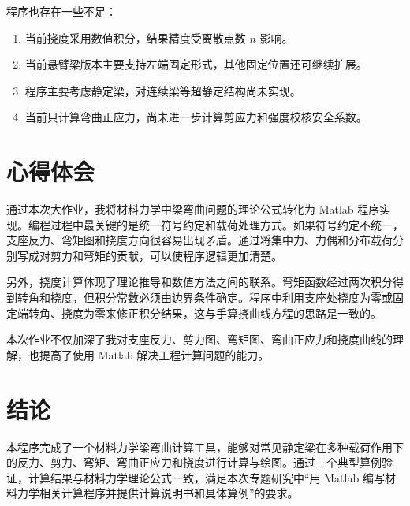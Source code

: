 \documentclass[UTF8,a4paper,12pt]{ctexart}
\numberwithin{equation}{section}
\begin{document}
程序也存在一些不足：

\begin{enumerate}
    \item 当前挠度采用数值积分，结果精度受离散点数 $n$ 影响。
    \item 当前悬臂梁版本主要支持左端固定形式，其他固定位置还可继续扩展。
    \item 程序主要考虑静定梁，对连续梁等超静定结构尚未实现。
    \item 当前只计算弯曲正应力，尚未进一步计算剪应力和强度校核安全系数。
\end{enumerate}

\section{心得体会}

通过本次大作业，我将材料力学中梁弯曲问题的理论公式转化为 Matlab 程序实现。编程过程中最关键的是统一符号约定和载荷处理方式。如果符号约定不统一，支座反力、弯矩图和挠度方向很容易出现矛盾。通过将集中力、力偶和分布载荷分别写成对剪力和弯矩的贡献，可以使程序逻辑更加清楚。

另外，挠度计算体现了理论推导和数值方法之间的联系。弯矩函数经过两次积分得到转角和挠度，但积分常数必须由边界条件确定。程序中利用支座处挠度为零或固定端转角、挠度为零来修正积分结果，这与手算挠曲线方程的思路是一致的。

本次作业不仅加深了我对支座反力、剪力图、弯矩图、弯曲正应力和挠度曲线的理解，也提高了使用 Matlab 解决工程计算问题的能力。

\section{结论}

本程序完成了一个材料力学梁弯曲计算工具，能够对常见静定梁在多种载荷作用下的反力、剪力、弯矩、弯曲正应力和挠度进行计算与绘图。通过三个典型算例验证，计算结果与材料力学理论公式一致，满足本次专题研究中“用 Matlab 编写材料力学相关计算程序并提供计算说明书和具体算例”的要求。
\end{document}

